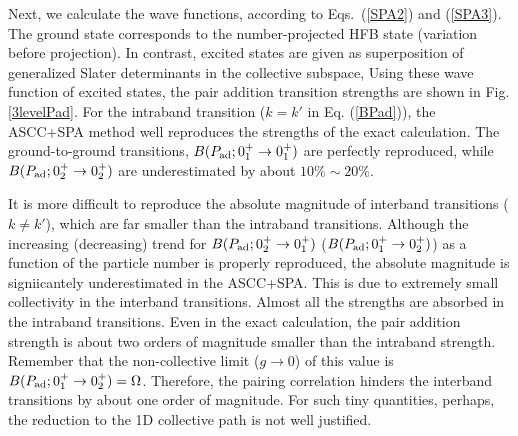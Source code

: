 \documentclass[%
superscriptaddress,
showpacs,
nofootinbib,
amsmath,amssymb,
aps,
prc,
twocolumn,
floatfix ]%
{revtex4-1}
\begin{document}
Next, we calculate the wave functions,
according to Eqs.~(\ref{SPA2}) and (\ref{SPA3}).
The ground state corresponds to the number-projected HFB state
(variation before projection).
In contrast, excited states are given as superposition of
generalized Slater determinants in the collective subspace,
Using these wave function of excited states, 
the pair addition transition strengths
are shown in Fig. \ref{3levelPad}.
For the intraband transition ($k=k'$ in Eq. (\ref{BPad})),
the ASCC+SPA method well reproduces the strengths of the exact calculation.
The ground-to-ground transitions, $B(P_{\rm ad};0_1^+\rightarrow 0_1^+)$
are perfectly reproduced, while
$B(P_{\rm ad};0_2^+\rightarrow 0_2^+)$ are underestimated 
by about $10\%\sim20\%$.

It is more difficult to reproduce the absolute magnitude of
interband transitions ($k\neq k'$), 
which are far smaller than the intraband transitions.
Although the increasing (decreasing) trend for
$B(P_{\rm ad};0_2^+\rightarrow 0_1^+)$
($B(P_{\rm ad};0_1^+\rightarrow 0_2^+)$)
as a function of the particle number is properly reproduced,
the absolute magnitude is signiicantely underestimated in the ASCC+SPA.
This is due to extremely small collectivity in the interband transitions.
Almost all the strengths are absorbed in the intraband transitions.
Even in the exact calculation, the pair addition strength is
about two orders of magnitude smaller than the intraband strength.
Remember that the non-collective limit ($g\rightarrow 0$) of this
value is $B(P_{\rm ad};0_1^+\rightarrow 0_2^+)=\Omega$.
Therefore, the pairing correlation hinders the interband transitions
by about one order of magnitude.
For such tiny quantities, perhaps, 
the reduction to the 1D collective path is not well justified.


\end{document}
